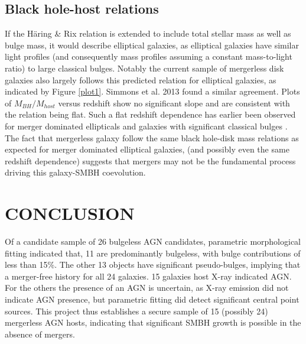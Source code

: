 \documentclass[11pt,twocolumn]{article}
\begin{document}
\subsection{Black hole-host relations}
If the H\"{a}ring \& Rix relation is extended to include total stellar mass as well as bulge mass, it would describe elliptical galaxies, as elliptical galaxies have similar light profiles (and consequently mass profiles assuming a constant mass-to-light ratio) to large classical bulges. Notably the current sample of mergerless disk galaxies also largely follows this predicted relation for elliptical galaxies, as indicated by Figure \ref{plot1}. Simmons et al. 2013 found a similar agreement. Plots of $M_{BH}/M_{host}$ versus redshift show no significant slope and are consistent with the relation being flat. Such a flat redshift dependence has earlier been observed for merger dominated ellipticals and galaxies with significant classical bulges \cite{2011ApJ...741L..11C}\cite{2011ApJ...734...92J}. The fact that mergerless galaxy follow the same black hole-disk mass relations as expected for merger dominated elliptical galaxies, (and possibly even the same redshift dependence) suggests that mergers may not be the fundamental process driving this galaxy-SMBH coevolution. 


\section{\normalsize CONCLUSION}
Of a candidate sample of 26 bulgeless AGN candidates, parametric morphological fitting indicated that, 11 are predominantly  bulgeless, with bulge contributions of less than 15\%. The other 13 objects have significant pseudo-bulges,  implying that a merger-free history for all 24 galaxies.  15 galaxies host X-ray indicated AGN. For the others the presence of an AGN is uncertain, as X-ray emission did not indicate AGN presence, but parametric fitting did detect significant central point sources. This project thus establishes a secure sample of 15 (possibly 24) mergerless AGN hosts, indicating that significant SMBH growth is possible in the absence of mergers.
\end{document}
